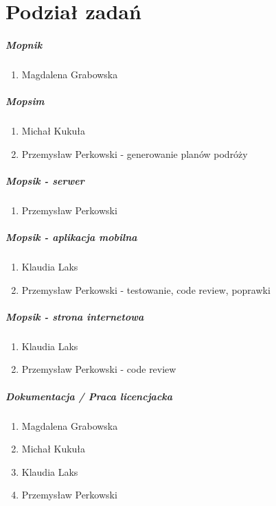 \chapter{Podział zadań}
\paragraph{Mopnik}
\begin{enumerate}
\item Magdalena Grabowska
\end{enumerate}

\paragraph{Mopsim}
\begin{enumerate}
\item Michał Kukuła
\item Przemysław Perkowski - generowanie planów podróży
\end{enumerate}

\paragraph{Mopsik - serwer}
\begin{enumerate}
\item Przemysław Perkowski
\end{enumerate}

\paragraph{Mopsik - aplikacja mobilna}
\begin{enumerate}
\item Klaudia Laks
\item Przemysław Perkowski - testowanie, code review, poprawki
\end{enumerate}

\paragraph{Mopsik - strona internetowa}
\begin{enumerate}
\item Klaudia Laks
\item Przemysław Perkowski - code review
\end{enumerate}

\paragraph{Dokumentacja / Praca licencjacka}
\begin{enumerate}
\item Magdalena Grabowska
\item Michał Kukuła
\item Klaudia Laks
\item Przemysław Perkowski
\end{enumerate}

